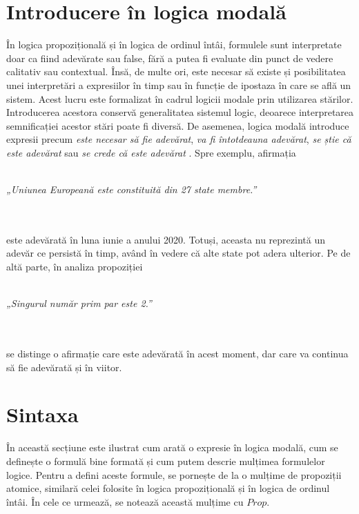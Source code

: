 \documentclass[12pt, openany]{book}
\begin{document}
        \section{Introducere în logica modală} %
        \label{section_intro_modal}
            \par{}
                În logica propozițională și în logica de ordinul întâi, formulele sunt interpretate doar ca 
                fiind adevărate sau false, fără a putea fi evaluate din punct de vedere calitativ sau contextual.
                Însă, de multe ori, este necesar să existe și posibilitatea unei interpretări a expresiilor 
                în timp sau în funcție de ipostaza în care se află un sistem. Acest lucru este formalizat 
                în cadrul logicii modale prin utilizarea stărilor. Introducerea acestora conservă generalitatea 
                sistemul logic, deoarece interpretarea semnificației acestor stări poate fi diversă. De asemenea, 
                logica modală introduce expresii precum \textit{este necesar să fie adevărat}, \textit{va 
                fi întotdeauna adevărat}, \textit{se știe că este adevărat} sau \textit{se crede că este adevărat}
                \cite{lecture_notes_hedin}. Spre exemplu, afirmația \\\\
                \centerline{\textit{„Uniunea Europeană este constituită din 27 state membre.”}} \\\\
                este adevărată în luna iunie a anului 2020. Totuși, aceasta nu reprezintă un adevăr ce persistă în 
                timp, având în vedere că alte state pot adera ulterior. Pe de altă parte, în analiza propoziției 
                \\\\ \centerline{\textit{„Singurul număr prim par este 2.”}} \\\\
                se distinge o afirmație care este adevărată în acest moment, dar care va continua să fie adevărată
                și în viitor.

        \section{Sintaxa} %
        \label{section_synthax}
            \par{}
                În această secțiune este ilustrat cum arată o expresie în logica modală, cum se definește o 
                formulă bine formată și cum putem descrie mulțimea formulelor logice. Pentru a defini aceste formule, 
                se pornește de la o mulțime de propoziții atomice, similară celei folosite în 
                logica propozițională și în logica de ordinul întâi. În cele ce urmează, se notează această mulțime 
                cu $Prop$.
            
\end{document}
